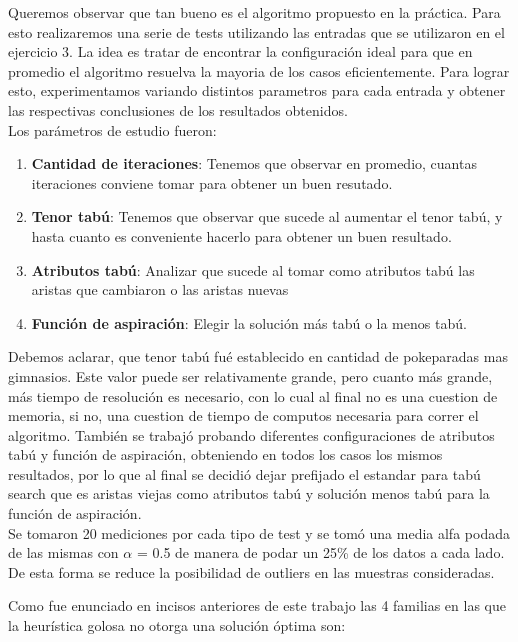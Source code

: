 Queremos observar que tan bueno es el algoritmo propuesto en la práctica. Para esto realizaremos una serie de tests utilizando las entradas que se utilizaron en el ejercicio 3.
La idea es tratar de encontrar la configuración ideal para que en promedio el algoritmo resuelva la mayoria de los casos eficientemente. Para lograr esto, experimentamos variando distintos parametros para cada entrada y obtener las respectivas conclusiones de los resultados obtenidos.\\
Los parámetros de estudio fueron:

\begin{enumerate}
\item  \textbf{Cantidad de iteraciones}: Tenemos que observar en promedio, cuantas iteraciones conviene tomar para obtener un buen resutado.
\item \textbf{Tenor tabú}: Tenemos que observar que sucede al aumentar el tenor tabú, y hasta cuanto es conveniente hacerlo para obtener un buen resultado.
\item \textbf{Atributos tabú}: Analizar que sucede al tomar como atributos tabú las aristas que cambiaron o las aristas nuevas
\item \textbf{Función de aspiración}: Elegir la solución más tabú o la menos tabú.
\end{enumerate}

Debemos aclarar, que tenor tabú fué establecido en cantidad de pokeparadas mas gimnasios. Este valor puede ser relativamente grande, pero cuanto más grande, más tiempo de resolución es necesario, con lo cual al final no es una cuestion de memoria, si no, una cuestion de tiempo de computos necesaria para correr el algoritmo.
También se trabajó probando diferentes configuraciones de atributos tabú y función de aspiración, obteniendo en todos los casos los mismos resultados, por lo que al final se decidió dejar prefijado el estandar para tabú search que es aristas viejas como atributos tabú y solución menos tabú para la función de aspiración.\\

Se tomaron 20 mediciones por cada tipo de test y se tomó una media alfa podada de las mismas con $\alpha$ = 0.5 de manera de podar un 25\% de los datos a cada lado.  De esta forma se reduce la posibilidad de outliers en las muestras consideradas.

Como fue enunciado en incisos anteriores de este trabajo las 4 familias en las que la heur\'istica golosa no otorga una soluci\'on \'optima son:

